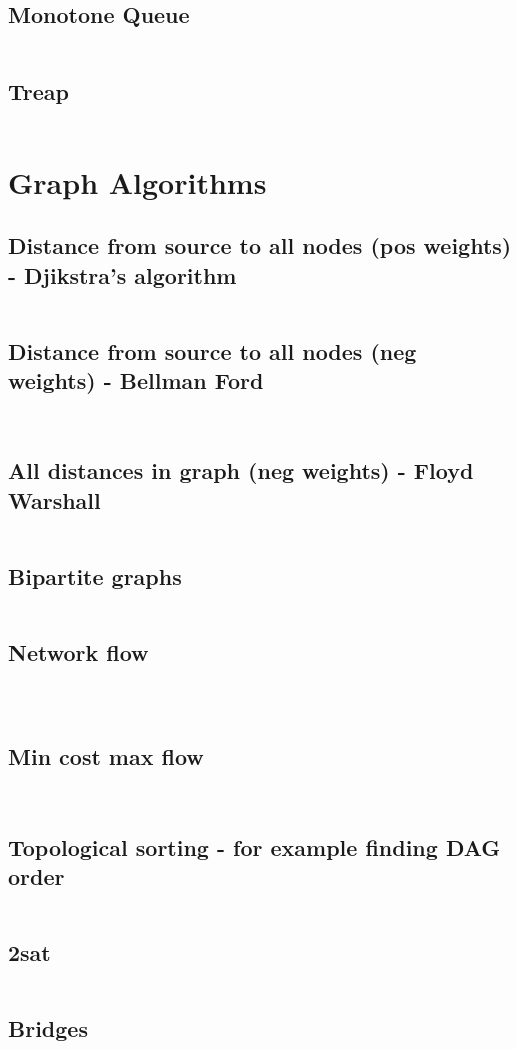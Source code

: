 \documentclass[8pt,a4paper,landscape,oneside]{amsart}
\newcommand{\codej}[1]{\inputminted[fontsize=\large,tabsize=2,baselinestretch=1]{java}{code/#1}}
\newcommand{\codec}[1]{\inputminted[fontsize=\large,tabsize=2,baselinestretch=1]{cpp}{code/#1}}
\newcommand{\codep}[1]{\inputminted[fontsize=\large,tabsize=2,baselinestretch=1]{py}{code/#1}}
\begin{document}
\begin{multicols*}{2}
\begin{large}
\subsection{Monotone Queue}
\codep{monotonequeue.py}
\subsection{Treap}
\codec{Treap.cpp}
\section{Graph Algorithms}
\subsection{Distance from source to all nodes (pos weights) - Djikstra's algorithm}
\codep{dijkstra.py}
\subsection{Distance from source to all nodes (neg weights) - Bellman Ford}
\codep{bellmanford.py}
\codec{bellmanford.cpp}
\subsection{All distances in graph (neg weights) - Floyd Warshall}
\codep{floydwarshall.py}
\subsection{Bipartite graphs}
\codec{kuhns.cpp}
\subsection{Network flow}
\codec{dinic.cpp}
\codep{maxflow.py}
\codep{maxflow2.py}
\subsection{Min cost max flow}
\codep{mincostmaxflow.py}
\codej{mincostmaxflow.cpp}
\subsection{Topological sorting - for example finding DAG order}
\codep{topsort.py}
\subsection{2sat}
\codec{2sat.cpp}
\subsection{Bridges}
\codec{bridges.cpp}

\end{large}
\end{multicols*}
\end{document}
